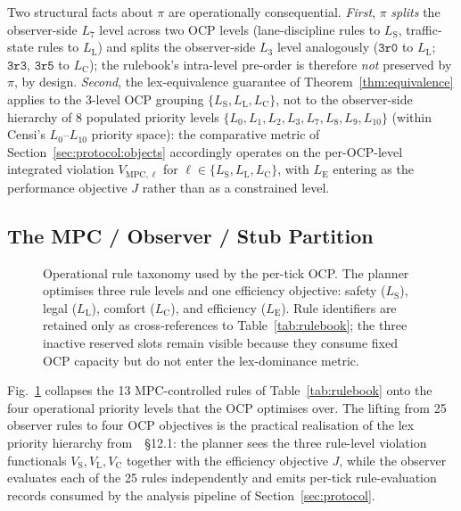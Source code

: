 Two structural facts about $\pi$ are operationally consequential. \emph{First}, $\pi$ \emph{splits} the observer-side $L_7$ level across two OCP levels (lane-discipline rules to $L_{\mathrm{S}}$, traffic-state rules to $L_{\mathrm{L}}$) and splits the observer-side $L_3$ level analogously ($\texttt{3r0}$ to $L_{\mathrm{L}}$; $\texttt{3r3}$, $\texttt{3r5}$ to $L_{\mathrm{C}}$); the rulebook's intra-level pre-order is therefore \emph{not} preserved by $\pi$, by design. \emph{Second}, the lex-equivalence guarantee of Theorem~\ref{thm:equivalence} applies to the 3-level OCP grouping $\{L_{\mathrm{S}}, L_{\mathrm{L}}, L_{\mathrm{C}}\}$, not to the observer-side hierarchy of 8 populated priority levels $\{L_0, L_1, L_2, L_3, L_7, L_8, L_9, L_{10}\}$ (within Censi's $L_0$--$L_{10}$ priority space): the comparative metric of Section~\ref{sec:protocol:objects} accordingly operates on the per-OCP-level integrated violation $V_{\mathrm{MPC}, \ell}$ for $\ell \in \{L_{\mathrm{S}}, L_{\mathrm{L}}, L_{\mathrm{C}}\}$, with $L_{\mathrm{E}}$ entering as the performance objective $J$ rather than as a constrained level.

\subsection{The MPC / Observer / Stub Partition}
\label{sec:rulebook:partition}

\begin{figure}[t]
    \centering
    
    \caption{Operational rule taxonomy used by the per-tick OCP. The planner optimises three rule levels and one efficiency objective: safety ($L_{\mathrm{S}}$), legal ($L_{\mathrm{L}}$), comfort ($L_{\mathrm{C}}$), and efficiency ($L_{\mathrm{E}}$). Rule identifiers are retained only as cross-references to Table~\ref{tab:rulebook}; the three inactive reserved slots remain visible because they consume fixed OCP capacity but do not enter the lex-dominance metric.}
    \label{fig:rule_level_mapping}
\end{figure}

Fig.~\ref{fig:rule_level_mapping} collapses the 13 MPC-controlled rules of Table~\ref{tab:rulebook} onto the four operational priority levels that the OCP optimises over. The lifting from 25 observer rules to four OCP objectives is the practical realisation of the lex priority hierarchy from~\cite{lcp2025}~\S12.1: the planner sees the three rule-level violation functionals $V_{\mathrm{S}}, V_{\mathrm{L}}, V_{\mathrm{C}}$ together with the efficiency objective $J$, while the observer evaluates each of the 25 rules independently and emits per-tick rule-evaluation records consumed by the analysis pipeline of Section~\ref{sec:protocol}.

